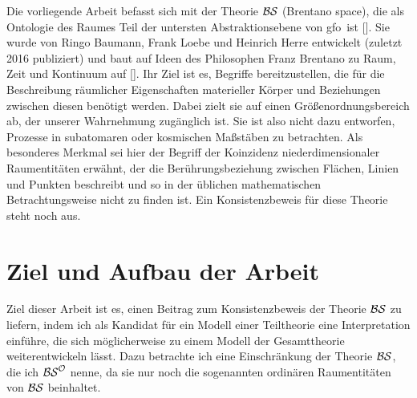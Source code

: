     Die
    vorliegende Arbeit befasst sich mit der Theorie $\mathcal{BS}$ (Brentano space), die als Ontologie des Raumes Teil der untersten Abstraktionsebene von \ac{gfo}\ ist [\cite{baumann-r-2016-53-a}].
    Sie wurde von Ringo Baumann, Frank Loebe und Heinrich Herre entwickelt (zuletzt 2016 publiziert) und baut auf Ideen des Philosophen Franz Brentano zu Raum, Zeit und Kontinuum auf [\cite{brentano-f-1976--a}].
    Ihr Ziel ist es, Begriffe bereitzustellen, die für die Beschreibung räumlicher Eigenschaften materieller Körper und Beziehungen zwischen diesen benötigt werden.
    Dabei zielt sie auf einen Größenordnungsbereich ab, der unserer Wahrnehmung zugänglich ist.
    Sie ist also nicht dazu entworfen, Prozesse in subatomaren oder kosmischen Maßstäben zu betrachten.
    Als besonderes Merkmal sei hier der Begriff der Koinzidenz niederdimensionaler Raumentitäten erwähnt, der die Berührungsbeziehung zwischen Flächen, Linien und Punkten beschreibt und so in der üblichen mathematischen Betrachtungsweise nicht zu finden ist.
    Ein Konsistenzbeweis für diese Theorie steht noch aus.
    

\section{Ziel und Aufbau der Arbeit}
Ziel dieser Arbeit ist es, einen Beitrag zum Konsistenzbeweis der Theorie $\mathcal{BS}$ zu liefern, indem ich als Kandidat für ein Modell einer Teiltheorie eine Interpretation einführe, die sich möglicherweise zu einem Modell der Gesamttheorie weiterentwickeln lässt.
Dazu betrachte ich eine Einschränkung der Theorie $\mathcal{BS}$, die ich $\mathcal{BS}^{\mathcal{O}}$ nenne, da sie nur noch die sogenannten ordinären Raumentitäten von $\mathcal{BS}$ beinhaltet.

